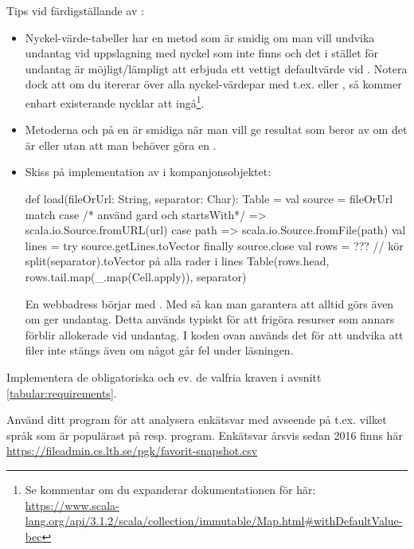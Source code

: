 \noindent Tips vid färdigställande av :
\begin{itemize}[leftmargin=*]
  \item Nyckel-värde-tabeller har en metod  som är smidig om man vill undvika undantag vid uppslagning med nyckel som inte finns och det i stället för undantag är möjligt/lämpligt att erbjuda ett vettigt defaultvärde vid . Notera dock att om du itererar över alla nyckel-värdepar med t.ex.  eller , så kommer enbart existerande nycklar att ingå\footnote{Se kommentar om du expanderar dokumentationen för  här: \url{https://www.scala-lang.org/api/3.1.2/scala/collection/immutable/Map.html\#withDefaultValue-bec}}.
  \item Metoderna  och  på en  är smidiga när man vill ge resultat som beror av om det är  eller  utan att man behöver göra en .
\item Skiss på implementation av  i kompanjonsobjektet:
\begin{CodeSmall}
def load(fileOrUrl: String, separator: Char): Table = {
  val source = fileOrUrl match {
    case /* använd gard och startsWith*/ => scala.io.Source.fromURL(url)
    case path  => scala.io.Source.fromFile(path)
  }
  val lines = try source.getLines.toVector finally source.close
  val rows = ??? // kör split(separator).toVector på alla rader i lines
  Table(rows.head, rows.tail.map(_.map(Cell.apply)), separator)
}
\end{CodeSmall}
En webbadress börjar med .
Med  så kan man garantera att  alltid görs även om  ger undantag. Detta används typiskt för att frigöra resurser som annars förblir allokerade vid undantag. I koden ovan används det för att undvika att filer inte stängs även om något går fel under läsningen.
\end{itemize}

\Task Implementera de obligatoriska och ev. de valfria kraven i avsnitt \ref{tabular:requirements}.

\Task Använd ditt program för att analysera enkätsvar med avseende på t.ex. vilket språk som är populärast på resp. program. Enkätsvar årsvis sedan 2016 finns här \url{https://fileadmin.cs.lth.se/pgk/favorit-snapshot.csv}

